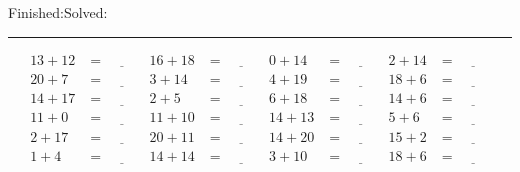 \documentclass{article}
\begin{document}
\begin{sloppy}
\begin{center}
{\selectfont {Started:}\underline{\hspace{1.5cm}}{Finished:}\underline{\hspace{1.5cm}}{Solved:}\underline{\hspace{1.5cm}}}
\end{center}
\hrule
\begin{align*}
    {13} + {12} &= \underline{\hspace{1cm}} & {16} + {18} &= \underline{\hspace{1cm}} & {0} + {14} &= \underline{\hspace{1cm}} & {2} + {14} &= \underline{\hspace{1cm}} \\
    {20} + {7} &= \underline{\hspace{1cm}} & {3} + {14} &= \underline{\hspace{1cm}} & {4} + {19} &= \underline{\hspace{1cm}} & {18} + {6} &= \underline{\hspace{1cm}} \\
    {14} + {17} &= \underline{\hspace{1cm}} & {2} + {5} &= \underline{\hspace{1cm}} & {6} + {18} &= \underline{\hspace{1cm}} & {14} + {6} &= \underline{\hspace{1cm}} \\
    {11} + {0} &= \underline{\hspace{1cm}} & {11} + {10} &= \underline{\hspace{1cm}} & {14} + {13} &= \underline{\hspace{1cm}} & {5} + {6} &= \underline{\hspace{1cm}} \\
    {2} + {17} &= \underline{\hspace{1cm}} & {20} + {11} &= \underline{\hspace{1cm}} & {14} + {20} &= \underline{\hspace{1cm}} & {15} + {2} &= \underline{\hspace{1cm}} \\
    {1} + {4} &= \underline{\hspace{1cm}} & {14} + {14} &= \underline{\hspace{1cm}} & {3} + {10} &= \underline{\hspace{1cm}} & {18} + {6} &= \underline{\hspace{1cm}} \\

\end{align*}
\end{sloppy}
\end{document}
